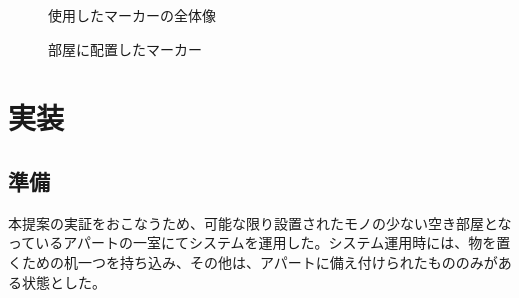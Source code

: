 \begin{figure}[htbp]
  \begin{minipage}{0.5\hsize}
    \begin{center}
    \end{center}
    \caption{使用したマーカーの全体像}
    \label{fig:marker}
  \end{minipage}
  \begin{minipage}{0.5\hsize}
    \begin{center}
    \end{center}
    \caption{部屋に配置したマーカー}
  \end{minipage}
\end{figure}


\section{実装}

\subsection{準備}

本提案の実証をおこなうため、可能な限り設置されたモノの少ない空き部屋となっているアパートの一室にてシステムを運用した。システム運用時には、物を置くための机一つを持ち込み、その他は、アパートに備え付けられたもののみがある状態とした。

